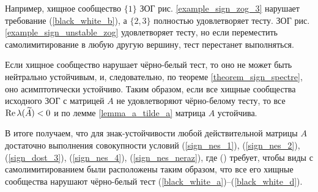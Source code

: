         Например, хищное сообщество \(\{1\}\) ЗОГ рис. \ref{example_sign_zog_3} нарушает требование (\ref{black_white_b}), а \(\{ 2, 3 \}\) полностью удовлетворяет тесту. ЗОГ рис. \ref{example_sign_unstable_zog} удовлетворяет тесту, но если переместить самолимитирование в любую другую вершину, тест перестанет выполняться.

        Если хищное сообщество нарушает чёрно-белый тест, то оно не может быть нейтрально устойчивым, и, следовательно, по теореме \ref{theorem_sign_spectre}, оно асимптотически устойчиво. Таким образом, если все хищные сообщества исходного ЗОГ с матрицей \(A\) не удовлетворяют чёрно-белому тесту, то все \(\operatorname{Re} \lambda(\widetilde{A}) < 0\) и по лемме \ref{lemma_a_tilde_a} матрица \(A\) устойчива.

        В итоге получаем, что для знак-устойчивости любой действительной матрицы \(A\) достаточно выполнения совокупности условий (\ref{sign_nes_1}), (\ref{sign_nes_2}), (\ref{sign_dost_3}), (\ref{sign_nes_4}), (\ref{sign_nes_neraz}), где () требует, чтобы виды с самолимитированием были расположены таким образом, что все его хищные сообщества нарушают чёрно-белый тест (\ref{black_white_a})--(\ref{black_white_d}).